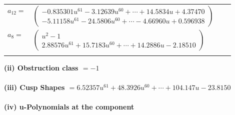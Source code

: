 \documentclass[1p]{elsarticle_modified}
\theoremstyle{definition}
\begin{document}
\begin{tabular}{m{7pt} m{180pt} m{7pt} m{180pt} }
\flushright $a_{12}=$&$\begin{pmatrix}-0.835301 u^{61}-3.12639 u^{60}+\cdots+14.5834 u+4.37470\\-5.11158 u^{61}-24.5806 u^{60}+\cdots-4.66960 u+0.596938\end{pmatrix}$ \\
\flushright $a_{8}=$&$\begin{pmatrix}u^2-1\\2.88576 u^{61}+15.7183 u^{60}+\cdots+14.2886 u-2.18510\end{pmatrix}$\\&\end{tabular}
\flushleft \textbf{(ii) Obstruction class $= -1$}\\~\\
\flushleft \textbf{(iii) Cusp Shapes $= 6.52357 u^{61}+48.3926 u^{60}+\cdots+104.147 u-23.8150$}\\~\\
\newpage\renewcommand{\arraystretch}{1}
\flushleft \textbf{(iv) u-Polynomials at the component}\newline \\
\end{document}
